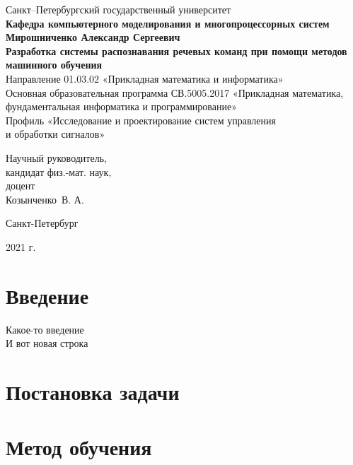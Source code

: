 \documentclass[12pt]{article}
\begin{document}
\begin{titlepage}
\begin{center}
Санкт--Петербургский государственный университет \\
\textbf{Кафедра компьютерного моделирования и многопроцессорных систем}
\vspace{55mm} \\
\textbf{\large Мирошниченко Александр Сергеевич} \\[10mm]
\textbf{\large Разработка системы распознавания речевых команд при помощи методов машинного обучения} \\
Направление 01.03.02 «Прикладная математика и информатика»\\
Основная образовательная программа СВ.5005.2017
«Прикладная математика, фундаментальная информатика и программирование»\\
Профиль «Исследование и проектирование систем управления\\ и обработки сигналов»\\[30mm]
\begin{flushright}
{Научный руководитель,} \\
кандидат физ.-мат. наук, \\доцент \\Козынченко~В. А. 
\end{flushright}
\vfill 
{Санкт-Петербург}
\par{2021 г.}
\end{center}
\end{titlepage}
\addtocounter{page}{1}

\tableofcontents

\newpage
{}
\section*{Введение}
Какое-то введение \\
И вот новая строка

\section*{Постановка задачи}

\section*{Метод обучения}
\end{document}
